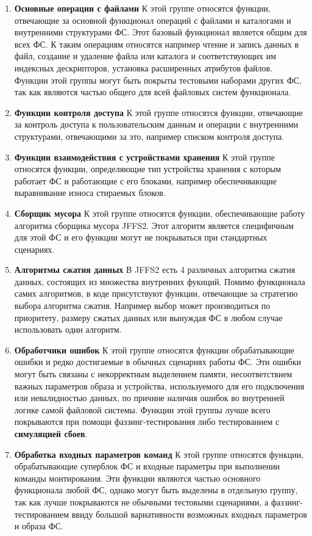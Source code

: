 \begin{enumerate}
	\item \textbf{Основные операции с файлами}
	К этой группе относятся функции, отвечающие за основной функционал операций с файлами и каталогами и внутренними структурами  ФС. Этот базовый функционал является общим для всех ФС. К таким операциям относятся например чтение и запись данных в файл, создание и удаление файла или каталога и соответствующих им индексных дескрипторов, установка расширенных атрибутов файлов. Функции этой группы могут быть покрыты тестовыми наборами других ФС, так как являются частью общего для всей файловых систем функционала.
	\item \textbf{Функции контроля доступа}
	К этой группе относятся функции, отвечающие за контроль доступа к пользовательским данным и операции с внутренними структурами, отвечающими за это, например списком контроля доступа.
	\item \textbf{Функции взаимодействия с устройствами хранения}
	К этой группе относятся функции, определяющие тип устройства хранения с которым работает ФС и работающие с его блоками, например обеспечивающие выравнивание износа стираемых блоков.
	\item \textbf{Сборщик мусора}
	К этой группе относятся функции, обеспечивающие работу алгоритма сборщика мусора JFFS2. Этот алгоритм является специфичным для этой ФС и его функции могут не покрываться при стандартных сценариях.
	\item \textbf{Алгоритмы сжатия данных}
	В JFFS2 есть 4 различных алгоритма сжатия данных, состоящих из множества внутренних фукнций. Помимо функционала самих алгоритмов, в коде присутствуют функции, отвечающие за стратегию выбора алгоритма сжатия. Например выбор может производиться по приоритету, размеру сжатых данных или вынуждая ФС в любом случае использовать один алгоритм.
	\item \textbf{Обработчики ошибок}
	К этой группе относятся функции обрабатывающие ошибки и редко достигаемые в обычных сценариях работы ФС. Эти ошибки могут быть связаны с некорректным выделением памяти, несоответствием важных параметров образа и устройства, используемого для его подключения или невалидностью данных, по причине наличия ошибок во внутренней логике самой файловой системы. Функции этой группы лучше всего покрываются при помощи фаззинг-тестирования либо тестированием с \textbf{симуляцией сбоев}.
	\item \textbf{Обработка входных параметров команд}
	К этой группе относятся функции, обрабатывающие суперблок ФС и входные параметры при выполнении команды монтирования. Эти функции являются частью основного функционала любой ФС, однако могут быть выделены в отдельную группу, так как лучше покрываются не обычными тестовыми сценариями, а фаззинг-тестированием ввиду большой вариативности возможных входных параметров и образа ФС.

\end{enumerate}
